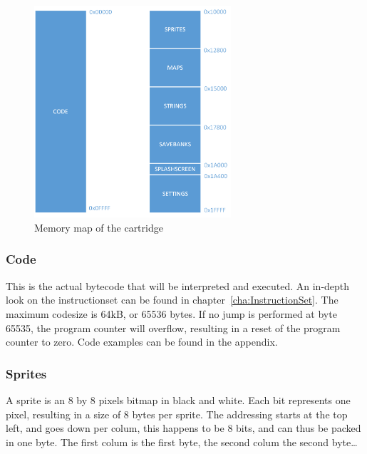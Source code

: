 		\begin{figure}[H]
			\centering
			\includegraphics[width=0.65\textwidth]{GameConsole/MemoryMap.PNG}
			\caption{Memory map of the cartridge}\par
			\label{fig:MemoryMap}
		\end{figure}

		\subsubsection{Code}
			\par This is the actual bytecode that will be interpreted and executed. An in-depth look on the instructionset can be found in chapter~\ref{cha:InstructionSet}. The maximum codesize is 64kB, or 65536 bytes. If no jump is performed at byte 65535, the program counter will overflow, resulting in a reset of the program counter to zero. Code examples can be found in the appendix.

		\subsubsection{Sprites}
		\label{subsec:sprites}
			\par A sprite is an 8 by 8 pixels bitmap in black and white. Each bit represents one pixel, resulting in a size of 8 bytes per sprite.
			The addressing starts at the top left, and goes down per colum, this happens to be 8 bits, and can thus be packed in one byte.
			The first colum is the first byte, the second colum the second byte\ldots

